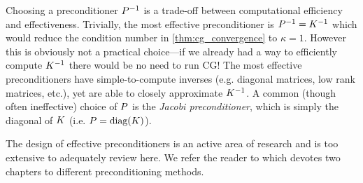 

Choosing a preconditioner $P^{-1}$ is a trade-off between computational efficiency and effectiveness.
Trivially, the most effective preconditioner is $P^{-1} = K^{-1}$ which would reduce the condition number in \cref{thm:cg_convergence} to $\kappa = 1$.
However this is obviously not a practical choice---if we already had a way to efficiently compute $K^{-1}$ there would be no need to run CG!
The most effective preconditioners have simple-to-compute inverses (e.g. diagonal matrices, low rank matrices, etc.), yet are able to closely approximate $K^{-1}$.
A common (though often ineffective) choice of $P$ is the \emph{Jacobi preconditioner}, which is simply the diagonal of $K$ (i.e. $P = \text{diag}(K)$).

The design of effective preconditioners is an active area of research and is too extensive to adequately review here.
We refer the reader to \cite{saad2003iterative} which devotes two chapters to different preconditioning methods.



